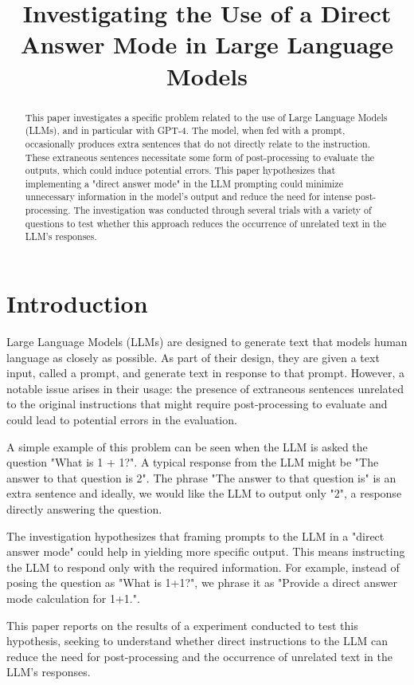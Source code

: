 \documentclass{article}
\title{Investigating the Use of a Direct Answer Mode in Large Language Models}
\author{}
\begin{document}
\maketitle

\begin{abstract}
This paper investigates a specific problem related to the use of Large Language Models (LLMs), and in particular with GPT-4. The model, when fed with a prompt, occasionally produces extra sentences that do not directly relate to the instruction. These extraneous sentences necessitate some form of post-processing to evaluate the outputs, which could induce potential errors. This paper hypothesizes that implementing a "direct answer mode" in the LLM prompting could minimize unnecessary information in the model's output and reduce the need for intense post-processing. The investigation was conducted through several trials with a variety of questions to test whether this approach reduces the occurrence of unrelated text in the LLM's responses.
\end{abstract}

\section{Introduction}

Large Language Models (LLMs) are designed to generate text that models human language as closely as possible. As part of their design, they are given a text input, called a prompt, and generate text in response to that prompt. However, a notable issue arises in their usage: the presence of extraneous sentences unrelated to the original instructions that might require post-processing to evaluate and could lead to potential errors in the evaluation.

A simple example of this problem can be seen when the LLM is asked the question "What is 1 + 1?". A typical response from the LLM might be "The answer to that question is 2". The phrase "The answer to that question is" is an extra sentence and ideally, we would like the LLM to output only "2", a response directly answering the question.

The investigation hypothesizes that framing prompts to the LLM in a "direct answer mode" could help in yielding more specific output. This means instructing the LLM to respond only with the required information. For example, instead of posing the question as "What is 1+1?", we phrase it as "Provide a direct answer mode calculation for 1+1.".

This paper reports on the results of a experiment conducted to test this hypothesis, seeking to understand whether direct instructions to the LLM can reduce the need for post-processing and the occurrence of unrelated text in the LLM's responses.
\end{document}
